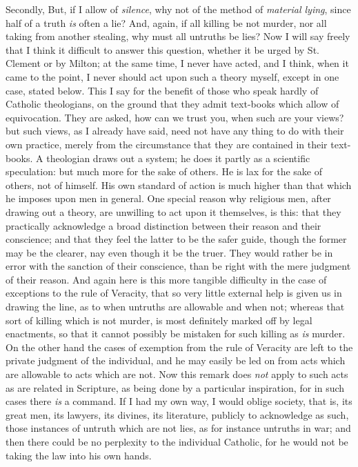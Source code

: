 Secondly, But, if I allow of \emph{silence}, why not of the method of
\emph{material lying}, since half of a truth \emph{is} often a lie? And,
again, if all killing be not murder, nor all taking from another
stealing, why must all untruths be lies? Now I will say freely that I
think it difficult to answer this question, whether it be urged by St.
Clement or by Milton; at the same time, I never have acted, and I think,
when it came to the point, I never should act upon such a theory myself,
except in one case, stated below. This I say for the benefit of those
who speak hardly of Catholic theologians, on the ground that they admit
text-books which allow of equivocation. They are asked, how can we trust
you, when such are your views? but such views, as I already have said,
need not have any thing to do with their own practice, merely from the
circumstance that they are contained in their text-books. A theologian
draws out a system; he does it partly as a scientific speculation: but
much more for the sake of others. He is lax for the sake of others, not
of himself. His own standard of action is much higher than that which he
imposes upon men in general. One special reason why religious men, after
drawing out a theory, are unwilling to act upon it themselves, is this:
that they practically acknowledge a broad distinction between their
reason and their conscience; and that they feel the latter to be the
safer guide, though the former may be the clearer, nay even though it be
the truer. They would rather be in error with the sanction
of their conscience, than be right with the mere
judgment of their reason. And again here is this more tangible
difficulty in the case of exceptions to the rule of Veracity, that
so very little external help is given us in drawing the line, as to when
untruths are allowable and when not; whereas that sort of killing which
is not murder, is most definitely marked off by legal enactments, so
that it cannot possibly be mistaken for such killing as \emph{is}
murder. On the other hand the cases of exemption from the rule of
Veracity are left to the private judgment of the individual, and he may
easily be led on from acts which are allowable to acts which are not.
Now this remark does \emph{not} apply to such acts as are related in
Scripture, as being done by a particular inspiration, for in such cases
there \emph{is} a command. If I had my own way, I would oblige society,
that is, its great men, its lawyers, its divines, its literature,
publicly to acknowledge as such, those instances of untruth which are
not lies, as for instance untruths in war; and then there could be no
perplexity to the individual Catholic, for he would not be taking the law into his own hands.

